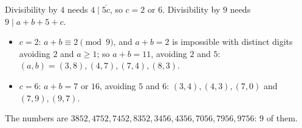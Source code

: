 Divisibility by $4$ needs $4\mid\overline{5c}$, so $c=2$ or $6$. Divisibility by $9$ needs $9\mid a+b+5+c$.
\begin{itemize}
\item $c=2$: $a+b\equiv2\pmod9$, and $a+b=2$ is impossible with distinct digits avoiding $2$ and $a\ge1$; so $a+b=11$, avoiding $2$ and $5$: $(a,b)=(3,8),(4,7),(7,4),(8,3)$.
\item $c=6$: $a+b=7$ or $16$, avoiding $5$ and $6$: $(3,4),(4,3),(7,0)$ and $(7,9),(9,7)$.
\end{itemize}
The numbers are $3852,4752,7452,8352,3456,4356,7056,7956,9756$: $\boxed{9}$ of them.
